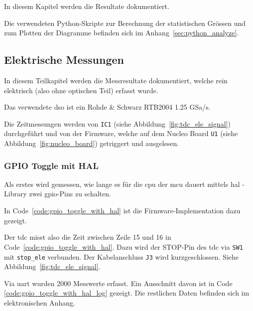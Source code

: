 In diesem Kapitel werden die Resultate dokumentiert.

Die verwendeten Python-Skripte zur Berechnung der statistischen Grössen und zum Plotten der Diagramme befinden sich im
Anhang~\ref{sec:python_analyze}.

\subsection{Elektrische Messungen}\label{sec:electrical_measurements}

In diesem Teilkapitel werden die Messresultate dokumentiert, welche rein elektrisch (also ohne optischen Teil) erfasst
wurde.

Das verwendete \acrfull{dso} ist ein Rohde \& Schwarz RTB2004 1.25 GSa/s.

Die Zeitmessungen werden von \lstinline|IC1| (siehe Abbildung~\ref{fig:tdc_ele_signal}) durchgeführt und von der
Firmware, welche auf dem Nucleo Board \lstinline|U1| (siehe Abbildung~\ref{fig:nucleo_board}) getriggert und ausgelesen.

\subsubsection{GPIO Toggle mit HAL}\label{sec:gpio_toggle_with_hal}

Als erstes wird gemessen, wie lange es für die \acrshort{cpu} der \acrshort{mcu} dauert mittels \acrfull{hal} - Library
\cite{st2020stm32f0_hal} zwei \acrshort{gpio}-Pins zu schalten.

In Code~\ref{code:gpio_toggle_with_hal} ist die Firmware-Implementation dazu gezeigt.



Der \acrshort{tdc} misst also die Zeit zwischen Zeile 15 und 16 in Code~\ref{code:gpio_toggle_with_hal}. Dazu wird der
STOP-Pin des \acrshort{tdc} via \lstinline|SW1| mit \lstinline|stop_ele| verbunden. Der Kabelanschluss \lstinline|J3|
wird kurzgeschlossen. Siehe Abbildung~\ref{fig:tdc_ele_signal}.

Via \acrshort{uart} wurden 2000 Messwerte erfasst. Ein Ausschnitt davon ist in Code \ref{code:gpio_toggle_with_hal_log}
gezeigt. Die restlichen Daten befinden sich im elektronischen Anhang.



